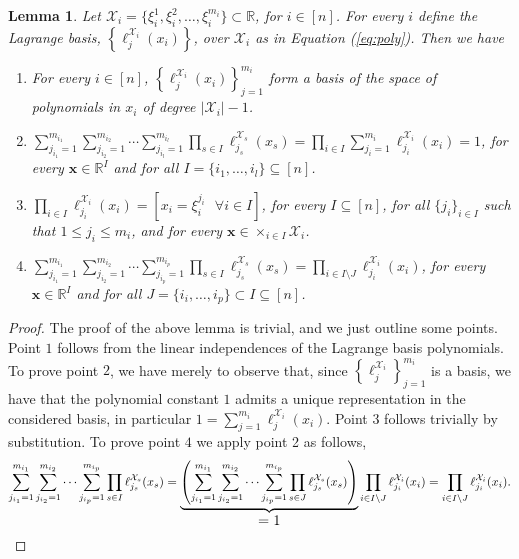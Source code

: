 \documentclass[11pt,a4paper, twoside]{book}
\newtheorem{lemma}{Lemma}[chapter]
\newcommand{\nchi}{\mathcal{X}}
\begin{document}
\begin{lemma}
\label{lem:LAG}
Let $\nchi_i=\{\xi_i^1,\xi_i^2,\ldots,\xi_i^{m_i}\} \subset \mathbb{R}$, for $i \in [n]$. For every $i$ define the Lagrange basis, $\left\{ \ell_j^{\nchi_i}(x_i)\right\}$, over $\nchi_i$ as in Equation (\ref{eq:poly}). Then we have
\begin{enumerate}
\item  For every $i \in [n]$, $\left\{ \ell_j^{\nchi_i}(x_i)\right\}_{j=1}^{m_i}$ form a basis of the space of polynomials in $x_i$ of degree $|\nchi_i|-1$.
\item $\sum_{j_{i_1}=1}^{m_{i_1}}\sum_{j_{i_2}=1}^{m_{i_2}}\cdots\sum_{j_{i_l}=1}^{m_{i_l}}\prod_{{s \in I}} \ell_{j_{{s}}}^{\nchi_{{s}}}(x_{s})=\prod_{i \in I}\sum_{j_i=1}^{m_i} \ell_{j_i}^{\nchi_i}(x_i)=1$, for every $\mathbf{x} \in \mathbb{R}^I$ and for all $I=\{i_1,\ldots,i_l\} \subseteq [n]$.
\item $ \prod_{i \in I} \ell_{j_i}^{\nchi_i}(x_i)=[ x_i=\xi_i^{j_i} \text{ } \forall i \in I]$, for every $I \subseteq [n]$, for all {$\{j_i\}_{i\in I}$ such that $1\leq j_i \leq m_i$, and for every $\mathbf{x} \in \times_{i\in I}\nchi_i $.}
\item $\sum_{j_{i_1}=1}^{m_{i_1}}\sum_{j_{i_2}=1}^{m_{i_2}}\cdots\sum_{j_{i_p}=1}^{m_{i_p}}\prod_{{s \in I}} \ell_{j_{{s}}}^{\nchi_{{s}}}(x_{s})=\prod_{i \in I\setminus J} \ell_{j_i}^{\nchi_i}(x_i)$, for every $\mathbf{x} \in \mathbb{R}^{I}$ and for all $J=\{i_i,\ldots,i_p\}\subset I\subseteq [n]$.
\end{enumerate}   
\end{lemma}
\begin{proof}
The proof of the above lemma is trivial, and we just outline some points.
Point $1$ follows from the linear independences of the Lagrange basis polynomials. To prove point $2$, we have merely to observe that, since $\left\{ \ell_j^{\nchi_i} \right\}_{j=1}^{m_i}$ is a basis, we have that the polynomial constant $1$ admits a unique representation in the considered basis, in particular
$ 1=\sum_{j=1}^{m_i} \ell_j^{\nchi_i}(x_i).$
Point $3$ follows trivially by substitution. To prove point $4$ we apply point 2 as follows,
$$ \sum_{j_{i_1}=1}^{m_{i_1}}\sum_{j_{i_2}=1}^{m_{i_2}}\cdots\sum_{j_{i_p}=1}^{m_{i_p}}\prod_{{s \in I}} \ell_{j_{{s}}}^{\nchi_{{s}}}(x_{s})=\underbrace{\left(\sum_{j_{i_1}=1}^{m_{i_1}}\sum_{j_{i_2}=1}^{m_{i_2}}\cdots\sum_{j_{i_p}=1}^{m_{i_p}}\prod_{{s \in J}} \ell_{j_{{s}}}^{\nchi_{{s}}}(x_{s})\right)}_{\text{\large $=1$}}\prod_{i \in I\setminus J}\ell_{j_{{i}}}^{\nchi_{{i}}}(x_{i}) =\prod_{i \in I\setminus J} \ell_{j_i}^{\nchi_i}(x_i). $$
\end{proof}
\end{document}

